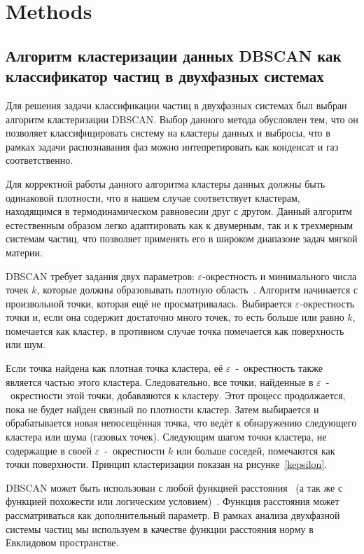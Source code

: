 \section{Methods}
\label{PRIMe-SecMethods}

\subsection{Алгоритм кластеризации данных DBSCAN как классификатор частиц в двухфазных системах}
\label{PRIMe-SubSecDBSCAN}

Для решения задачи классификации частиц в двухфазных системах был выбран алгоритм кластеризации DBSCAN.
Выбор данного метода обусловлен тем, что он позволяет классифицировать систему на кластеры данных и выбросы, что в рамках задачи распознавания фаз можно интепретировать как конденсат и газ соответственно.

Для корректной работы данного алгоритма кластеры данных должны быть одинаковой плотности, что в нашем случае соответствует кластерам, находящимся в термодинамическом равновесии друг с другом.
Данный алгоритм естественным образом легко адаптировать как к двумерным, так и к трехмерным системам частиц, что позволяет применять его в широком диапазоне задач мягкой материи.

DBSCAN требует задания двух параметров: $\varepsilon$-окрестность и минимального числа точек $k$, которые должны образовывать плотную область~\cite{schubert2017dbscan}.
Алгоритм начинается с произвольной точки, которая ещё не просматривалась.
Выбирается $\varepsilon$-окрестность точки и, если она содержит достаточно много точек, то есть больше или равно $k$, помечается как кластер, в противном случае точка помечается как поверхность или шум.

Если точка найдена как плотная точка кластера, её $\varepsilon$~-~окрестность также является частью этого кластера.
Следовательно, все точки, найденные в $\varepsilon$~-~окрестности этой точки, добавляются к кластеру.
Этот процесс продолжается, пока не будет найден связный по плотности кластер.
Затем выбирается и обрабатывается новая непосещённая точка, что ведёт к обнаружению следующего кластера или шума (газовых точек).
Следующим шагом точки кластера, не содержащие в своей $\varepsilon$~-~окрестности $k$ или больше соседей, помечаются как точки поверхности.
Принцип кластеризации показан на рисунке~\ref{kepsilon}.

DBSCAN может быть использован с любой функцией расстояния~\cite{ester1996density, schubert2017dbscan} (а так же с функцией похожести или логическим условием)~\cite{10.1023/a:1009745219419}.
Функция расстояния может рассматриваться как дополнительный параметр.
В рамках анализа двухфазной системы частиц мы используем в качестве функции расстояния норму в Евклидовом пространстве.

